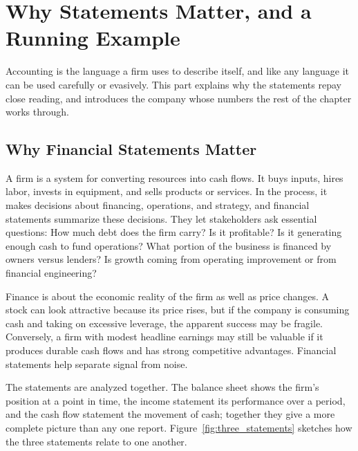 \documentclass[../ai_in_finance]{subfiles}
\begin{document}
\section{Why Statements Matter, and a Running Example}

Accounting is the language a firm uses to describe itself, and like any language it can be used carefully or evasively. This part explains why the statements repay close reading, and introduces the company whose numbers the rest of the chapter works through.

\subsection{Why Financial Statements Matter}

A firm is a system for converting resources into cash flows. It buys inputs, hires labor, invests in equipment, and sells products or services. In the process, it makes decisions about financing, operations, and strategy, and financial statements summarize these decisions. They let stakeholders ask essential questions: How much debt does the firm carry? Is it profitable? Is it generating enough cash to fund operations? What portion of the business is financed by owners versus lenders? Is growth coming from operating improvement or from financial engineering?

Finance is about the economic reality of the firm as well as price changes. A stock can look attractive because its price rises, but if the company is consuming cash and taking on excessive leverage, the apparent success may be fragile. Conversely, a firm with modest headline earnings may still be valuable if it produces durable cash flows and has strong competitive advantages. Financial statements help separate signal from noise.

The statements are analyzed together. The balance sheet shows the firm's position at a point in time, the income statement its performance over a period, and the cash flow statement the movement of cash; together they give a more complete picture than any one report. Figure~\ref{fig:three_statements} sketches how the three statements relate to one another.
\end{document}
